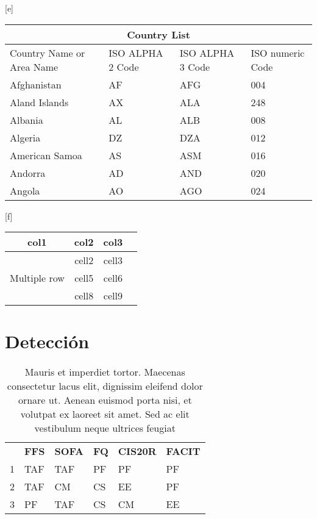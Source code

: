 \begin{center}[e]
\begin{tabular}{ |p{3cm}||p{3cm}|p{3cm}|p{3cm}|  }
 \hline
 \multicolumn{4}{|c|}{Country List} \\
 \hline
 Country Name     or Area Name& ISO ALPHA 2 Code &ISO ALPHA 3 Code&ISO numeric Code\\
 \hline
 Afghanistan   & AF    &AFG&   004\\
 Aland Islands&   AX  & ALA   &248\\
 Albania &AL & ALB&  008\\
 Algeria    &DZ & DZA&  012\\
 American Samoa&   AS  & ASM&016\\
 Andorra& AD  & AND   &020\\
 Angola& AO  & AGO&024\\
 \hline
\end{tabular}
\end{center}


\begin{center}[f]
\begin{tabular}{ |c|c|c|c| } 
\hline
col1 & col2 & col3 \\
\hline
\multirow{3}{4em}{Multiple row} & cell2 & cell3 \\ 
& cell5 & cell6 \\ 
& cell8 & cell9 \\ 
\hline
\end{tabular}
\end{center}

\section{Detección}



\begin{table}
\footnotesize
\centering
\caption{Mauris et imperdiet     tortor. Maecenas consectetur lacus elit, dignissim eleifend dolor  ornare ut. Aenean euismod porta nisi, et volutpat ex laoreet sit amet. Sed ac elit vestibulum neque ultrices feugiat}
\label{tab:recopilacionDeCuestionarios}
\begin{tabular}{m{0.2cm}m{2.5cm}m{2.5cm}m{2.5cm}m{2.5cm}m{2.5cm}}
\hline\noalign{\smallskip}
 & \textbf{FFS} & \textbf{SOFA} & \textbf{FQ} & \textbf{CIS20R} & \textbf{FACIT}
\\ \noalign{\smallskip}
\hline
\noalign{\smallskip}
1	&	TAF	&	TAF	&	PF	&	PF	&	PF\\
2	&	TAF	&	CM	&	CS	&	EE	&	PF\\
3	&	PF	&	TAF	&	CS	&	CM	&	EE\\
\hline
\end{tabular}
\end{table}




